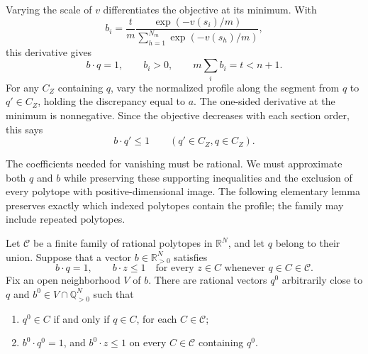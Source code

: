 Varying the scale of $v$ differentiates the objective at its minimum.  With
\begin{equation}
 b_i=\frac{t}{m}
       \frac{\exp(-v(s_i)/m)}{\sum_{h=1}^{N_m}\exp(-v(s_h)/m)},
 \label{eq:supporting-functional}
\end{equation}
this derivative gives
\begin{equation}
 b\cdot q=1,
 \qquad b_i>0,
 \qquad m\sum_i b_i=t<n+1.
 \label{eq:supporting-budget}
\end{equation}
For any $C_Z$ containing $q$, vary the normalized profile along the segment from $q$ to $q'\in C_Z$, holding the discrepancy equal to $a$.  The one-sided derivative at the minimum is nonnegative.  Since the objective decreases with each section order, this says
\begin{equation}
 b\cdot q'\leq1\qquad(q'\in C_Z, q\in C_Z).
 \label{eq:supporting-inequality}
\end{equation}

The coefficients needed for vanishing must be rational. We must approximate both $q$ and $b$ while preserving these supporting inequalities and the exclusion of every polytope with positive-dimensional image. The following elementary lemma preserves exactly which indexed polytopes contain the profile; the family may include repeated polytopes.

\begin{lemma}
\label{lem:rational-support}
Let $\mathcal{C}$ be a finite family of rational polytopes in $\mathbb{R}^N$, and let $q$ belong to their union.  Suppose that a vector $b\in\mathbb{R}_{>0}^N$ satisfies
\[
 b\cdot q=1,
 \qquad b\cdot z\leq 1
 \quad\text{for every }z\in C\text{ whenever }q\in C\in\mathcal{C}.
\]
Fix an open neighborhood $V$ of $b$.  There are rational vectors $q^0$ arbitrarily close to $q$ and $b^0\in V\cap\mathbb{Q}_{>0}^N$ such that
\begin{enumerate}
\item $q^0\in C$ if and only if $q\in C$, for each
      $C\in\mathcal{C}$;
\item $b^0\cdot q^0=1$, and $b^0\cdot z\leq1$ on every
      $C\in\mathcal{C}$ containing $q^0$.
\end{enumerate}
\end{lemma}

